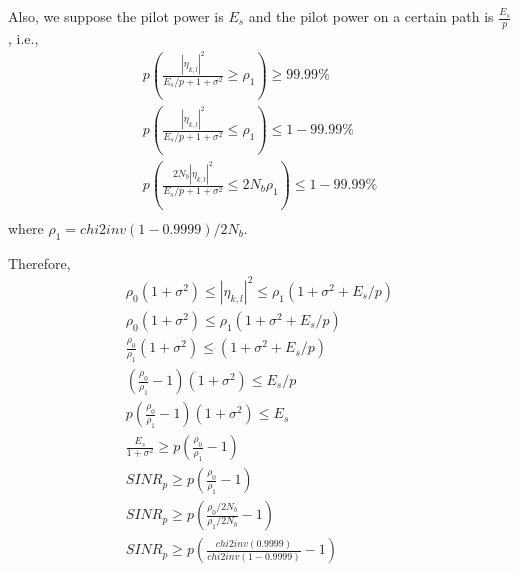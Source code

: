 \documentclass{article}
\begin{document}
Also, we suppose the pilot power is ${E_s}$ and the pilot power on a certain path is $\frac{E_s}{p}$, i.e.,
\begin{equation}
\begin{split}
p(\frac{|\eta_{k,l}|^2}{E_s/p + 1+\sigma^2} \geq \rho_1) \geq 99.99\% \\
p(\frac{|\eta_{k,l}|^2}{E_s/p + 1+\sigma^2} \leq \rho_1) \leq 1-99.99\% \\
p(\frac{2N_b|\eta_{k,l}|^2}{E_s/p + 1+\sigma^2} \leq 2N_b\rho_1) \leq 1-99.99\% \\
\end{split}
\end{equation}
where $\rho_1 = chi2inv(1-0.9999)/2N_b$.

Therefore,
\begin{equation}
\begin{split}
\rho_0(1+\sigma^2) \leq |\eta_{k,l}|^2 \leq \rho_1(1+\sigma^2 + E_s/p) \\
\rho_0(1+\sigma^2) \leq \rho_1(1+\sigma^2 + E_s/p) \\
\frac{\rho_0}{\rho_1}(1+\sigma^2) \leq (1+\sigma^2 + E_s/p) \\
(\frac{\rho_0}{\rho_1} - 1)(1+\sigma^2) \leq E_s/p \\
p(\frac{\rho_0}{\rho_1} - 1)(1+\sigma^2) \leq E_s \\
\frac{E_s}{1+\sigma^2} \geq p(\frac{\rho_0}{\rho_1} - 1)\\
SINR_p \geq p(\frac{\rho_0}{\rho_1} - 1) \\
SINR_p \geq p(\frac{\rho_0/2N_b}{\rho_1/2N_b} - 1) \\
SINR_p \geq p(\frac{chi2inv(0.9999)}{chi2inv(1-0.9999)} - 1) \\
\end{split}
\end{equation}
\end{document}
